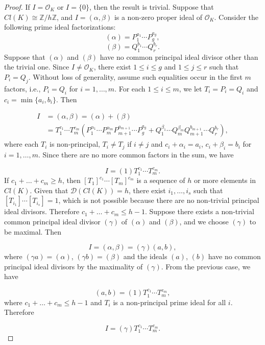 \documentclass[11pt]{article}
\theoremstyle{definition}
\begin{document}
\begin{proof}
   If $I=\mathcal{O}_K$ or $I=\{0\}$, then the result is trivial. Suppose that $Cl(K) \cong \mathbb{Z}/h\mathbb{Z}$, and $I=(\alpha,\beta)$ is a non-zero proper ideal of $\mathcal{O}_K$. Consider the following prime ideal factorizations:
\[ (\alpha) = P_1^{a_1} \cdots P_g^{a_g}, \]
\[ (\beta) = Q_1^{b_1} \cdots Q_r^{b_r}. \]
Suppose that $(\alpha)$ and $(\beta)$ have no common principal ideal divisor other than the trivial one. Since $I\neq \mathcal{O}_K$, there exist $1\leq i\leq g$ and $1\leq j\leq r$ such that $P_i=Q_j$. Without loss of generality, assume such equalities occur in the first $m$ factors, i.e., $P_i=Q_i$ for $i=1,\ldots, m$. For each $1\leq i\leq m$, we let $T_i=P_i=Q_i$ and $c_i=\min\{a_i,b_i\}$. Then

\begin{equation*}
\begin{split}
I &= (\alpha,\beta) = (\alpha) + (\beta) \\
  &= T_1^{c_1} \cdots T_m^{c_m} (P_1^{\alpha_1} \cdots P_m^{\alpha_m} P_{m+1}^{a_{m+1}} \cdots P_g^{a_g} + Q_1^{\beta_1} \cdots Q_m^{\beta_m} Q_{m+1}^{b_{m+1}} \cdots Q_r^{b_r}),
\end{split}
\end{equation*}
where each $T_i$ is non-principal, $T_i\neq T_j$ if $i\neq j$ and $c_i+\alpha_i=a_i$, $c_i+\beta_i=b_i$ for $i=1,\ldots, m$. Since there are no more common factors in the sum, we have

\[ I=(1)T_1^{c_1}\cdots T_m^{c_m}. \] 
If $c_1+\ldots+c_m\geq h$, then $[T_1]^{c_1}\cdots [T_m]^{c_m}$ is a sequence of $h$ or more elements in $Cl(K)$. Given that $\mathcal{D}(Cl(K))=h$, there exist $i_1,\ldots,i_s$ such that $[T_{i_1}]\cdots[T_{i_s}]=1$, which is not possible because there are no non-trivial principal ideal divisors. Therefore $c_1+\ldots+c_m\leq h-1$. Suppose there exists a non-trivial common principal ideal divisor $(\gamma)$ of $(\alpha)$ and $(\beta)$, and we choose $(\gamma)$ to be maximal. Then 

\[ I=(\alpha,\beta)=(\gamma)(a,b), \]
where $(\gamma a)=(\alpha)$, $(\gamma b)=(\beta)$ and the ideals $(a)$, $(b)$ have no common principal ideal divisors by the maximality of $(\gamma)$. From the previous case, we have 

\[ (a,b)=(1)T_1^{c_1}\cdots T_m^{c_m}, \]
where $c_1+\ldots+c_m\leq h-1$ and $T_i$ is a non-principal prime ideal for all $i$. Therefore 

\[ I=(\gamma)T_1^{c_1}\cdots T_m^{c_m}. \]
\end{proof}
\end{document}
